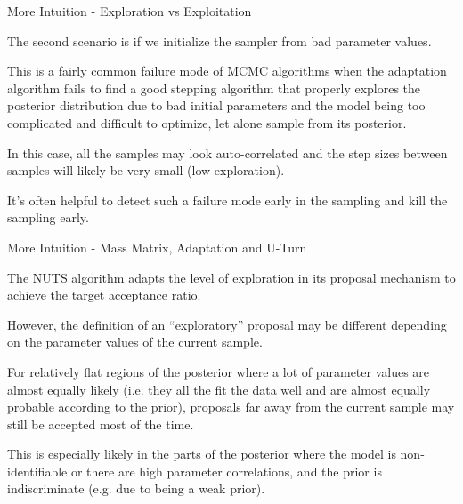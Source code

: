 \begin{frame}{More Intuition - Exploration vs Exploitation}
	\begin{vfilleditems}
		\item The second scenario is if we initialize the sampler from bad parameter values.
		\begin{vfilleditems}
			\item This is a fairly common failure mode of MCMC algorithms when the adaptation algorithm fails to find a good stepping algorithm that properly explores the posterior distribution due to bad initial parameters and the model being too complicated and difficult to optimize, let alone sample from its posterior.
			\item In this case, all the samples may look auto-correlated and the step sizes between samples will likely be very small (low exploration).
			\item It's often helpful to detect such a failure mode early in the sampling and kill the sampling early.
		\end{vfilleditems}
	\end{vfilleditems}
\end{frame}
\begin{frame}{More Intuition - Mass Matrix, Adaptation and U-Turn}
	\begin{vfilleditems}
		\item The NUTS algorithm adapts the level of exploration in its proposal mechanism to achieve the target acceptance ratio.
		\item However, the definition of an ``exploratory'' proposal may be different depending on the parameter values of the current sample.
		\item For relatively flat regions of the posterior where a lot of parameter values are almost equally likely (i.e. they all the fit the data well and are almost equally probable according to the prior), proposals far away from the current sample may still be accepted most of the time.
		\item This is especially likely in the parts of the posterior where the model is non-identifiable or there are high parameter correlations, and the prior is indiscriminate (e.g. due to being a weak prior).
	\end{vfilleditems}
\end{frame}

